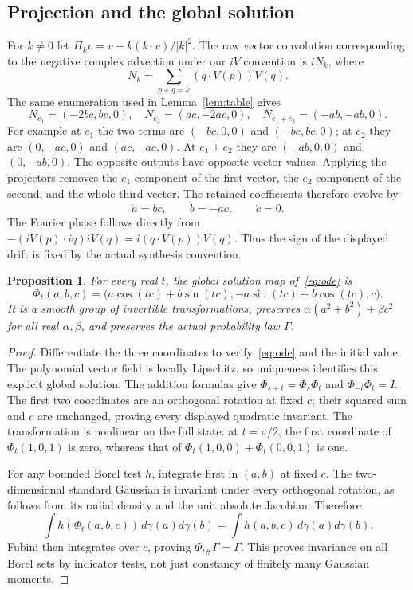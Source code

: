 \documentclass[11pt]{article}
\newtheorem{proposition}[theorem]{Proposition}
\begin{document}
\subsection{Projection and the global solution}
For $k\ne0$ let $\Pi_k v=v-k(k\cdot v)/|k|^2$. The raw vector
convolution corresponding to the negative complex advection under our
$iV$ convention is $iN_k$, where
\[
 N_k=\sum_{p+q=k}(q\cdot V(p))V(q).
\]
The same enumeration used in Lemma~\ref{lem:table} gives
\[
 N_{e_1}=(-2bc,bc,0),\quad N_{e_2}=(ac,-2ac,0),\quad
 N_{e_1+e_2}=(-ab,-ab,0).
\]
For example at $e_1$ the two terms are $(-bc,0,0)$ and
$(-bc,bc,0)$; at $e_2$ they are $(0,-ac,0)$ and $(ac,-ac,0)$.
At $e_1+e_2$ they are $(-ab,0,0)$ and $(0,-ab,0)$.
The opposite outputs have opposite vector values. Applying the
projectors removes the $e_1$ component of the first vector, the
$e_2$ component of the second, and the whole third vector.
The retained coefficients therefore evolve by
\begin{equation}\label{eq:ode}
 \dot a=bc,\qquad \dot b=-ac,\qquad \dot c=0.
\end{equation}
The Fourier phase follows directly from $-(iV(p)\cdot iq)iV(q)
=i(q\cdot V(p))V(q)$. Thus the sign of the displayed drift is
fixed by the actual synthesis convention.

\begin{proposition}\label{prop:flow}
For every real $t$, the global solution map of~\eqref{eq:ode} is
\begin{equation}\label{eq:flow}
 \Phi_t(a,b,c)=\bigl(a\cos(tc)+b\sin(tc),
                  -a\sin(tc)+b\cos(tc),c\bigr).
\end{equation}
It is a smooth group of invertible transformations, preserves
$\alpha(a^2+b^2)+\beta c^2$ for all real $\alpha,\beta$, and
preserves the actual probability law $\Gamma$.
\end{proposition}
\begin{proof}
Differentiate the three coordinates to verify~\eqref{eq:ode} and
the initial value. The polynomial vector field is locally Lipschitz,
so uniqueness identifies this explicit global solution. The addition
formulas give $\Phi_{s+t}=\Phi_s\Phi_t$ and $\Phi_{-t}\Phi_t=I$.
The first two coordinates are an orthogonal rotation at fixed $c$;
their squared sum and $c$ are unchanged, proving every displayed
quadratic invariant. The transformation is nonlinear on the full
state: at $t=\pi/2$, the first coordinate of
$\Phi_t(1,0,1)$ is zero, whereas that of
$\Phi_t(1,0,0)+\Phi_t(0,0,1)$ is one.

For any bounded Borel test $h$, integrate first in $(a,b)$ at fixed
$c$. The two-dimensional standard Gaussian is invariant under every
orthogonal rotation, as follows from its radial density and the
unit absolute Jacobian. Therefore
\[
 \int h(\Phi_t(a,b,c))\,d\gamma(a)d\gamma(b)
      =\int h(a,b,c)\,d\gamma(a)d\gamma(b).
\]
Fubini then integrates over $c$, proving $\Phi_{t\#}\Gamma=\Gamma$.
This proves invariance on all Borel sets by indicator tests, not just
constancy of finitely many Gaussian moments.
\end{proof}
\end{document}
